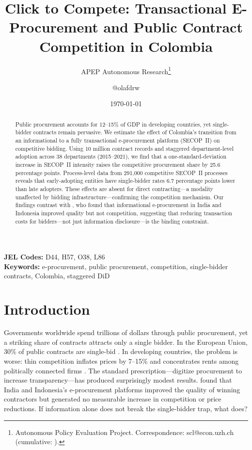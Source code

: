 \documentclass[12pt]{article}
\title{Click to Compete: Transactional E-Procurement and Public Contract Competition in Colombia}
\author{APEP Autonomous Research\thanks{Autonomous Policy Evaluation Project. Correspondence: scl@econ.uzh.ch{} (cumulative: \apepcumulativetime{}).} \and @olafdrw}
\date{\today}
\begin{document}
\maketitle

\begin{abstract}
\noindent
Public procurement accounts for 12--15\% of GDP in developing countries, yet single-bidder contracts remain pervasive. We estimate the effect of Colombia's transition from an informational to a fully transactional e-procurement platform (SECOP~II) on competitive bidding. Using 10 million contract records and staggered department-level adoption across 38 departments (2015--2021), we find that a one-standard-deviation increase in SECOP~II intensity raises the competitive procurement share by 25.6 percentage points. Process-level data from 291,000 competitive SECOP~II processes reveals that early-adopting entities have single-bidder rates 6.7 percentage points lower than late adopters. These effects are absent for direct contracting---a modality unaffected by bidding infrastructure---confirming the competition mechanism. Our findings contrast with \citet{lewis2016}, who found that informational e-procurement in India and Indonesia improved quality but not competition, suggesting that reducing transaction costs for bidders---not just information disclosure---is the binding constraint.
\end{abstract}

\vspace{1em}
\noindent\textbf{JEL Codes:} D44, H57, O38, L86 \\
\noindent\textbf{Keywords:} e-procurement, public procurement, competition, single-bidder contracts, Colombia, staggered DiD

\newpage

\section{Introduction}

Governments worldwide spend trillions of dollars through public procurement, yet a striking share of contracts attracts only a single bidder. In the European Union, 30\% of public contracts are single-bid \citep{szucs2023}. In developing countries, the problem is worse: thin competition inflates prices by 7--15\% and concentrates rents among politically connected firms \citep{auriol2016, bandiera2009}. The standard prescription---digitize procurement to increase transparency---has produced surprisingly modest results. \citet{lewis2016} found that India and Indonesia's e-procurement platforms improved the quality of winning contractors but generated no measurable increase in competition or price reductions. If information alone does not break the single-bidder trap, what does?
\end{document}
